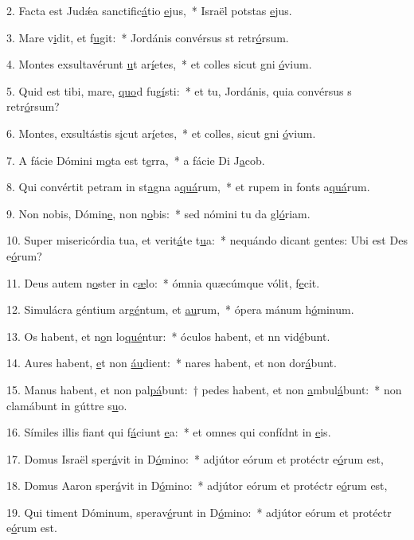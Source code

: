 2. Facta est Judǽa sanctific\uline{á}tio \uline{e}jus,~* Israël potstas \uline{e}jus.\par 
3. Mare v\uline{i}dit, et f\uline{u}git:~* Jordánis convérsus st retr\uline{ó}rsum.\par 
4. Montes exsultavérunt \uline{u}t ar\uline{í}etes,~* et colles sicut gni \uline{ó}vium.\par 
5. Quid est tibi, mare, \uline{quo}d fug\uline{í}sti:~* et tu, Jordánis, quia convérsus s retr\uline{ó}rsum?\par 
6. Montes, exsultástis s\uline{i}cut ar\uline{í}etes,~* et colles, sicut gni \uline{ó}vium.\par 
7. A fácie Dómini m\uline{o}ta est t\uline{e}rra,~* a fácie Di J\uline{a}cob.\par 
8. Qui convértit petram in st\uline{a}gna a\uline{quá}rum,~* et rupem in fonts a\uline{quá}rum.\par 
9. Non nobis, Dómin\uline{e}, non n\uline{o}bis:~* sed nómini tu da gl\uline{ó}riam.\par 
10. Super misericórdia tua, et verit\uline{á}te t\uline{u}a:~* nequándo dicant gentes: Ubi est Des e\uline{ó}rum?\par 
11. Deus autem n\uline{o}ster in c\uline{æ}lo:~* ómnia quæcúmque vólit, f\uline{e}cit.\par 
12. Simulácra géntium arg\uline{é}ntum, et \uline{au}rum,~* ópera mánum h\uline{ó}minum.\par 
13. Os habent, et n\uline{o}n lo\uline{qué}ntur:~* óculos habent, et nn vid\uline{é}bunt.\par 
14. Aures habent, \uline{e}t non \uline{áu}dient:~* nares habent, et non dor\uline{á}bunt.\par 
15. Manus habent, et non pal\uline{pá}bunt:~† pedes habent, et non \uline{a}mbul\uline{á}bunt:~* non clamábunt in gúttre s\uline{u}o.\par 
16. Símiles illis fiant qui f\uline{á}ciunt \uline{e}a:~* et omnes qui confídnt in \uline{e}is.\par 
17. Domus Israël sper\uline{á}vit in D\uline{ó}mino:~* adjútor eórum et protéctr e\uline{ó}rum est,\par 
18. Domus Aaron sper\uline{á}vit in D\uline{ó}mino:~* adjútor eórum et protéctr e\uline{ó}rum est,\par 
19. Qui timent Dóminum, sperav\uline{é}runt in D\uline{ó}mino:~* adjútor eórum et protéctr e\uline{ó}rum est.\par 
